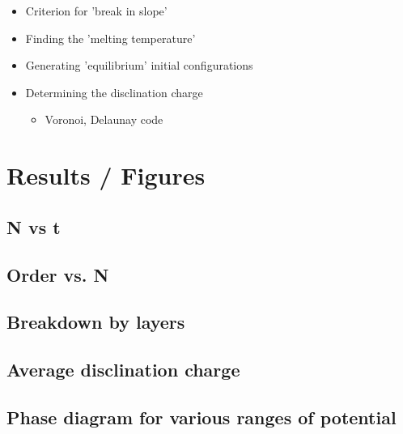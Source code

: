 \documentclass{umthesis}          %
\begin{document}
\begin{itemize}

\item Criterion for 'break in slope'\\
\label{sec-3.2.3.1}


\item Finding the 'melting temperature'\\
\label{sec-3.2.3.2}


\item Generating 'equilibrium' initial configurations\\
\label{sec-3.2.3.3}


\item Determining the disclination charge\\
\label{sec-3.2.3.4}

\begin{itemize}

\item Voronoi, Delaunay code\\
\label{sec-3.2.3.4.1}

\end{itemize} %
\end{itemize} %
\section{Results / Figures}
\label{sec-3.3}

\subsection{N vs t}
\label{sec-3.3.1}

\subsection{Order vs. N}
\label{sec-3.3.2}

\subsection{Breakdown by layers}
\label{sec-3.3.3}

\subsection{Average disclination charge}
\label{sec-3.3.4}

\subsection{Phase diagram for various ranges of potential}
\label{sec-3.3.5}
\end{document}
